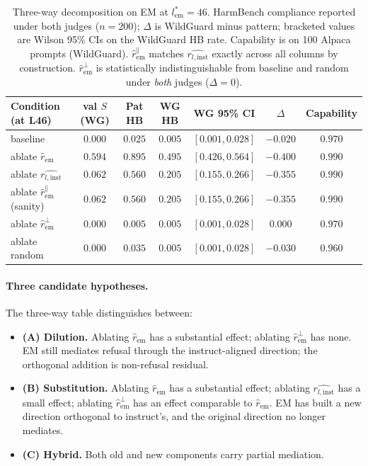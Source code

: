 \documentclass{article}
\newcommand{\rinst}{r_{l,\mathrm{inst}}}
\begin{document}
\begin{table}[t]
\caption{Three-way decomposition on EM at $l^{*}_{\mathrm{em}}=46$.
HarmBench compliance reported under both judges ($n=200$); $\Delta$
is WildGuard minus pattern; bracketed values are Wilson 95\% CIs on
the WildGuard HB rate. Capability is on 100 Alpaca prompts
(WildGuard). $\hat{r}^{\parallel}_{\mathrm{em}}$ matches
$\hat{\rinst}$ exactly across all columns by construction.
$\hat{r}^{\perp}_{\mathrm{em}}$ is statistically indistinguishable
from baseline and random under \emph{both} judges ($\Delta = 0$).}
\label{tab:phase2_threeway}
\centering
\small
\begin{tabular}{lcccccc}
\toprule
Condition (at L46) & val $S$ (WG) & Pat HB & WG HB & WG 95\% CI &
$\Delta$ & Capability \\
\midrule
baseline                                & $0.000$ & $0.025$ & $0.005$
& $[0.001, 0.028]$ & $-0.020$ & $0.970$ \\
ablate $\hat{r}_{\mathrm{em}}$          & $0.594$ & $0.895$ & $0.495$
& $[0.426, 0.564]$ & $-0.400$ & $0.990$ \\
ablate $\hat{\rinst}$                   & $0.062$ & $0.560$ & $0.205$
& $[0.155, 0.266]$ & $-0.355$ & $0.990$ \\
ablate $\hat{r}^{\parallel}_{\mathrm{em}}$ (sanity) & $0.062$ &
$0.560$ & $0.205$ & $[0.155, 0.266]$ & $-0.355$ & $0.990$ \\
ablate $\hat{r}^{\perp}_{\mathrm{em}}$  & $0.000$ & $\mathbf{0.005}$ &
$\mathbf{0.005}$ & $[0.001, 0.028]$ & $\mathbf{0.000}$ & $0.970$ \\
ablate random                           & $0.000$ & $0.035$ & $0.005$
& $[0.001, 0.028]$ & $-0.030$ & $0.960$ \\
\bottomrule
\end{tabular}
\end{table}

\paragraph{Three candidate hypotheses.} The three-way table
distinguishes between:

\begin{itemize}\itemsep1pt
\item \textbf{(A) Dilution.} Ablating $\hat{r}_{\mathrm{em}}$ has a
substantial effect; ablating $\hat{r}^{\perp}_{\mathrm{em}}$ has
none. EM still mediates refusal through the instruct-aligned
direction; the orthogonal addition is non-refusal residual.
\item \textbf{(B) Substitution.} Ablating $\hat{r}_{\mathrm{em}}$
has a substantial effect; ablating $\hat{\rinst}$ has a small
effect; ablating $\hat{r}^{\perp}_{\mathrm{em}}$ has an effect
comparable to $\hat{r}_{\mathrm{em}}$. EM has built a new direction
orthogonal to instruct's, and the original direction no longer
mediates.
\item \textbf{(C) Hybrid.} Both old and new components carry
partial mediation.
\end{itemize}
\end{document}
